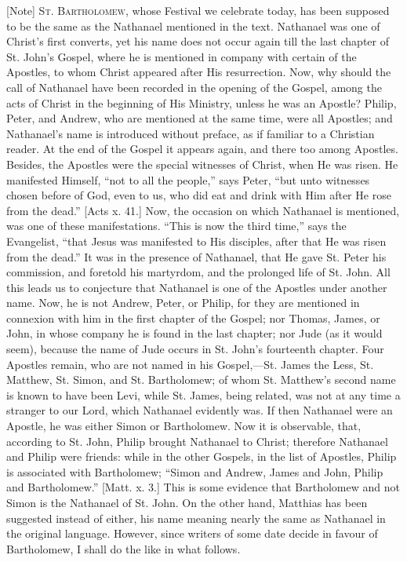 [Note] S\textsc{t}.
B\textsc{artholomew}, whose
Festival we celebrate today, has been supposed to be the same as the
Nathanael mentioned in the text. Nathanael was one of Christ's first
converts, yet his name does not occur again till the last chapter of St.
John's Gospel, where he is mentioned in company with certain of the
Apostles, to whom Christ appeared after His resurrection. Now, why
should the call of Nathanael have been recorded in the opening of the
Gospel, among the acts of Christ in the beginning of His Ministry,
unless he was an Apostle? Philip, Peter, and Andrew, who are mentioned
at the same time, were all Apostles; and Nathanael's name is introduced
without preface, as if familiar to a Christian reader. At the end of the
Gospel it appears again, and there too among Apostles. Besides, the
Apostles were the special witnesses of Christ, when He was risen. He
manifested Himself, ``not to all the people,'' says Peter,
``but unto witnesses chosen before of God, even to us, who did eat
and drink with Him after He rose from the dead.'' [Acts x. 41.] Now,
the occasion on which Nathanael is mentioned, was one of these
manifestations. ``This is now the third time,'' says the
Evangelist, ``that Jesus was manifested to His disciples, after that
He was risen from the dead.'' It was in the presence of Nathanael,
that He gave St. Peter his commission, and foretold his martyrdom, and
the prolonged life of St. John. All this leads us to conjecture that
Nathanael is one of the Apostles under another name. Now, he is not
Andrew, Peter, or Philip, for they are mentioned in connexion with him
in the first chapter of the Gospel; nor Thomas, James, or John, in whose
company he is found in the last chapter; nor Jude (as it would seem),
because the name of Jude occurs in St. John's fourteenth chapter. Four
Apostles remain, who are not named in his Gospel,—St. James the Less,
St. Matthew, St. Simon, and St. Bartholomew; of whom St. Matthew's
second name is known to have been Levi, while St. James, being related,
was not at any time a stranger to our Lord, which Nathanael evidently
was. If then Nathanael were an Apostle, he was either Simon or
Bartholomew. Now it is observable, that, according to St. John, Philip
brought Nathanael to Christ; therefore Nathanael and Philip were
friends: while in the other Gospels, in the list of Apostles, Philip is
associated with Bartholomew; ``Simon and Andrew, James and John,
Philip and Bartholomew.'' [Matt. x. 3.] This is some evidence that
Bartholomew and not Simon is the Nathanael of St. John. On the other
hand, Matthias has been suggested instead of either, his name meaning
nearly the same as Nathanael in the original language. However, since
writers of some date decide in favour of Bartholomew, I shall do the
like in what follows.

